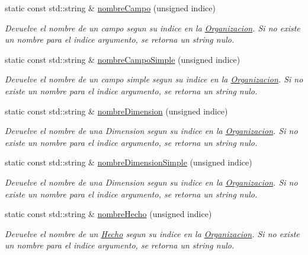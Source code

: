 \begin{DoxyCompactItemize}
static const std\-::string \& \hyperlink{classOrganizacion_a07eb9a61b81f4d2d3aa4fc66ffdbbbfa}{nombre\-Campo} (unsigned indice)
\begin{DoxyCompactList}\small\item\em \-Devuelve el nombre de un campo segun su indice en la \hyperlink{classOrganizacion}{\-Organizacion}. \-Si no existe un nombre para el indice argumento, se retorna un string nulo. \end{DoxyCompactList}\item 
static const std\-::string \& \hyperlink{classOrganizacion_a97c881f33d02fb1301ff5edfc3c5c39f}{nombre\-Campo\-Simple} (unsigned indice)
\begin{DoxyCompactList}\small\item\em \-Devuelve el nombre de un campo simple segun su indice en la \hyperlink{classOrganizacion}{\-Organizacion}. \-Si no existe un nombre para el indice argumento, se retorna un string nulo. \end{DoxyCompactList}\item 
static const std\-::string \& \hyperlink{classOrganizacion_afdcbc32f5a48c21d8d814f2289462a68}{nombre\-Dimension} (unsigned indice)
\begin{DoxyCompactList}\small\item\em \-Devuelve el nombre de una \-Dimension segun su indice en la \hyperlink{classOrganizacion}{\-Organizacion}. \-Si no existe un nombre para el indice argumento, se retorna un string nulo. \end{DoxyCompactList}\item 
static const std\-::string \& \hyperlink{classOrganizacion_a9f9ba53d668e5a6e1056d10bb2494cd8}{nombre\-Dimension\-Simple} (unsigned indice)
\begin{DoxyCompactList}\small\item\em \-Devuelve el nombre de una \-Dimension segun su indice en la \hyperlink{classOrganizacion}{\-Organizacion}. \-Si no existe un nombre para el indice argumento, se retorna un string nulo. \end{DoxyCompactList}\item 
static const std\-::string \& \hyperlink{classOrganizacion_aa5ccaedf53bdce391f7e0dd8f23a0892}{nombre\-Hecho} (unsigned indice)
\begin{DoxyCompactList}\small\item\em \-Devuelve el nombre de un \hyperlink{classHecho}{\-Hecho} segun su indice en la \hyperlink{classOrganizacion}{\-Organizacion}. \-Si no existe un nombre para el indice argumento, se retorna un string nulo. \end{DoxyCompactList}\item 

\end{DoxyCompactItemize}
